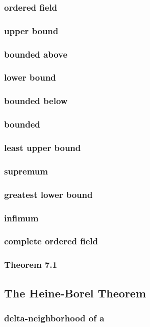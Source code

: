 \documentclass[a4paper]{article}
\begin{document}
\subsubsection*{ordered field}
\subsubsection*{upper bound}
\subsubsection*{bounded above}
\subsubsection*{lower bound}
\subsubsection*{bounded below}
\subsubsection*{bounded}
\subsubsection*{least upper bound}
\subsubsection*{supremum}
\subsubsection*{greatest lower bound}
\subsubsection*{infimum}
\subsubsection*{complete ordered field}
\subsubsection*{Theorem 7.1}

\newpage
\subsection{The Heine-Borel Theorem}   %
\subsubsection*{delta-neighborhood of a}
\end{document}
